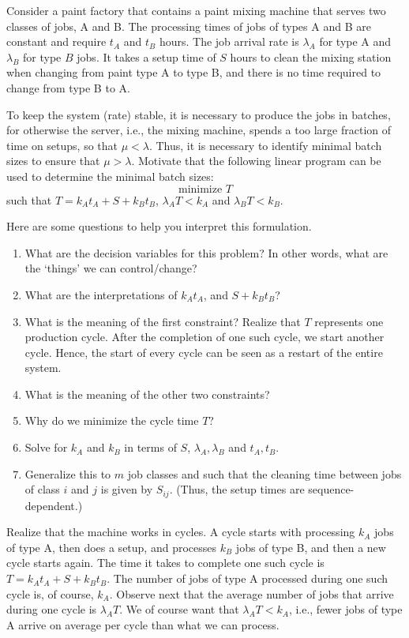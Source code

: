 \begin{exercise}
 Consider a paint factory that contains a paint mixing machine that serves two classes of jobs, A and B.
 The processing times of jobs of types A and B are constant and require $t_A$ and $t_B$ hours.
 The job arrival rate is $\lambda_A$ for type A and $\lambda_B$ for type $B$ jobs.
 It takes a setup time of $S$ hours to clean the mixing station when changing from paint type A to type B, and there is no time required to change from type B to A.

 To keep the system (rate) stable, it is necessary to produce the jobs in batches, for otherwise the server, i.e., the mixing machine, spends a too large fraction of time on setups, so that $\mu < \lambda$.
 Thus, it is necessary to identify minimal batch sizes to ensure that $\mu > \lambda$.
 Motivate that the following linear program can be used to determine the minimal batch sizes:
\begin{equation*}
 \text{minimize } T
\end{equation*}
such that $ T= k_A t_A + S + k_B t_B$, $\lambda_A T < k_A$ and $\lambda_B T < k_B$.
\begin{hint}
Here are some questions to help you interpret this formulation.
\begin{enumerate}
\item What are the decision variables for this problem? In other words, what are the `things' we can control/change?
\item What are the interpretations of $k_A t_A$, and $S+k_B t_B$?
\item What is the meaning of the first constraint? Realize that $T$
 represents one production cycle. After the completion of one such
 cycle, we start another cycle. Hence, the start of every cycle can
 be seen as a restart of the entire system.
\item What is the meaning of the other two constraints?
\item Why do we minimize the cycle time $T$?
\item Solve for $k_A$ and $k_B$ in terms of $S$, $\lambda_A, \lambda_B$ and $t_A, t_B$. 
\item Generalize this to $m$ job classes and such that the cleaning
 time between jobs of class $i$ and $j$ is given by $S_{i j}$. (Thus,
 the setup times are sequence-dependent.) 
\end{enumerate}
\end{hint}

\begin{solution}
 Realize that the machine works in cycles. A cycle starts with
 processing $k_A$ jobs of type A, then does a setup, and processes
 $k_B$ jobs of type B, and then a new cycle starts again. The time
 it takes to complete one such cycle is $T=k_A t_A + S + k_B t_B$.
 The number of jobs of type A processed during one such cycle is,
 of course, $k_A$. Observe next that the average number of jobs
 that arrive during one cycle is $\lambda_A T$. We of course want
 that $\lambda_A T< k_A$, i.e., fewer jobs of type A arrive on
 average per cycle than what we can process.
\end{solution}
\end{exercise}




